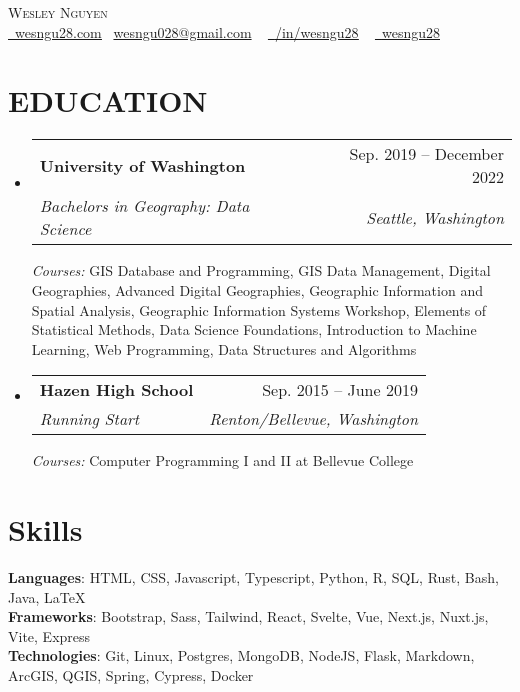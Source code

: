 \documentclass[letterpaper,11pt]{article}
\makeatletter
\newcommand{\resumeSubheading}[4]{
  \vspace{-2pt}\item
    \begin{tabular*}{0.97\textwidth}[t]{l@{\extracolsep{\fill}}r}
      \textbf{#1} & #2 \\
      \textit{\small#3} & \textit{\small #4} \\
    \end{tabular*}\vspace{-7pt}
}
\newcommand{\resumeSubHeadingListStart}{\begin{itemize}[leftmargin=0.15in, label={}]}
\newcommand{\resumeSubHeadingListEnd}{\end{itemize}}
\makeatother
\begin{document}

\begin{center}
    {\Huge \scshape Wesley Nguyen} \\ \vspace{1pt}\href{https://wesngu28.com}{\raisebox{-0.2\height}\faUser\ \underline{wesngu28.com}} {\raisebox{-0.2\height}\faEnvelope\  \underline{wesngu028@gmail.com}} ~
    \href{https://linkedin.com/in/wesngu28/}{\raisebox{-0.2\height}\faLinkedin\ \underline{/in/wesngu28}}  ~
    \href{https://github.com/wesngu28}{\raisebox{-0.2\height}\faGithub\ \underline{wesngu28}}
    \vspace{-8pt}
\end{center}


\section{EDUCATION}
  \resumeSubHeadingListStart
    \resumeSubheading
      {University of Washington}{Sep. 2019 -- December 2022}
      {Bachelors in Geography: Data Science}{Seattle, Washington}
      { \footnotesize{\newline{}\textit{{Courses:}} GIS Database and Programming, GIS Data Management, Digital Geographies, Advanced Digital Geographies, Geographic Information and Spatial Analysis, Geographic Information Systems Workshop, Elements of Statistical Methods, Data Science Foundations, Introduction to Machine Learning, Web Programming, Data Structures and Algorithms }}
    \resumeSubheading
      {Hazen High School}{Sep. 2015 -- June 2019}
      {Running Start}{Renton/Bellevue, Washington}
      { \footnotesize{\newline{}\textit{{Courses:}} Computer Programming I and II  at Bellevue College }}
  \resumeSubHeadingListEnd

\section{Skills}
 \begin{itemize}[leftmargin=0.15in, label={}]
    \small{\item{
     \textbf{Languages}{: HTML, CSS, Javascript, Typescript, Python, R, SQL, Rust, Bash, Java, LaTeX} \\
     \textbf{Frameworks}{: Bootstrap, Sass, Tailwind, React, Svelte, Vue, Next.js, Nuxt.js, Vite, Express} \\
     \textbf{Technologies}{: Git, Linux, Postgres, MongoDB, NodeJS, Flask, Markdown, ArcGIS, QGIS, Spring, Cypress, Docker} \\
    }}
 \end{itemize}
\end{document}
